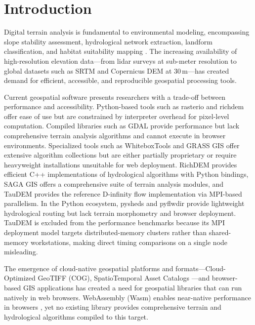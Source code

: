 \documentclass[preprint,review,12pt,authoryear]{elsarticle}
\begin{document}
\linenumbers

\section{Introduction}
\label{sec:introduction}

Digital terrain analysis is fundamental to environmental modeling, encompassing slope stability assessment, hydrological network extraction, landform classification, and habitat suitability mapping \citep{florinsky2025}. The increasing availability of high-resolution elevation data---from lidar surveys at sub-meter resolution to global datasets such as SRTM \citep{farr2007srtm} and Copernicus DEM at 30\,m---has created demand for efficient, accessible, and reproducible geospatial processing tools.

Current geospatial software presents researchers with a trade-off between performance and accessibility. Python-based tools such as rasterio and richdem offer ease of use but are constrained by interpreter overhead for pixel-level computation. Compiled libraries such as GDAL \citep{gdal2024} provide performance but lack comprehensive terrain analysis algorithms and cannot execute in browser environments. Specialized tools such as WhiteboxTools \citep{lindsay2016wbt} and GRASS GIS \citep{neteler2012} offer extensive algorithm collections but are either partially proprietary or require heavyweight installations unsuitable for web deployment. RichDEM \citep{barnes2016richdem} provides efficient C++ implementations of hydrological algorithms with Python bindings, SAGA GIS \citep{conrad2015} offers a comprehensive suite of terrain analysis modules, and TauDEM \citep{tarboton2015taudem} provides the reference D-infinity flow implementation \citep{tarboton1997} via MPI-based parallelism. In the Python ecosystem, pysheds \citep{bartos2020pysheds} and pyflwdir \citep{eilander2021pyflwdir} provide lightweight hydrological routing but lack terrain morphometry and browser deployment. TauDEM is excluded from the performance benchmarks because its MPI deployment model targets distributed-memory clusters rather than shared-memory workstations, making direct timing comparisons on a single node misleading.

The emergence of cloud-native geospatial platforms \citep{gorelick2017gee} and formats---Cloud-Optimized GeoTIFF (COG), SpatioTemporal Asset Catalogs \citep[STAC;][]{stac2021}---and browser-based GIS applications has created a need for geospatial libraries that can run natively in web browsers. WebAssembly (Wasm) enables near-native performance in browsers \citep{haas2017}, yet no existing library provides comprehensive terrain and hydrological algorithms compiled to this target.
\end{document}
